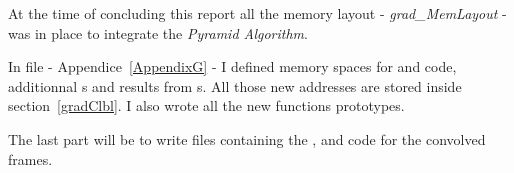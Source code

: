 At the time of concluding this report all the memory layout - \emph{grad\_MemLayout} - was in place to integrate the \emph{Pyramid Algorithm}.

In  file - Appendice~\ref{AppendixG} - I defined \ram{} memory spaces for  and  code, additionnal \uni{}s and results from \qpu{}s. All those new addresses are stored inside  section~\ref{gradClbl}. I also wrote all the new functions prototypes.

The last part will be to write  files containing the ,  and  code for the convolved frames.

